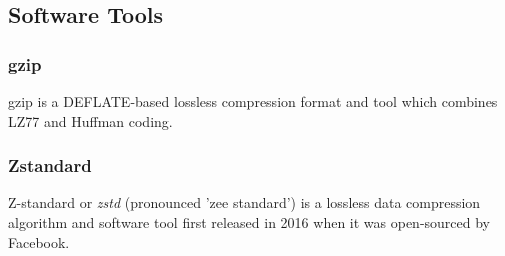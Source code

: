 \subsection{Software Tools}

\subsubsection{gzip}
gzip is a DEFLATE-based lossless compression format and tool which combines LZ77 and Huffman coding.

\subsubsection{Zstandard}

Z-standard or \textit{zstd} (pronounced 'zee standard') is a lossless data compression algorithm and software tool first released in 2016 when it was open-sourced by Facebook.
